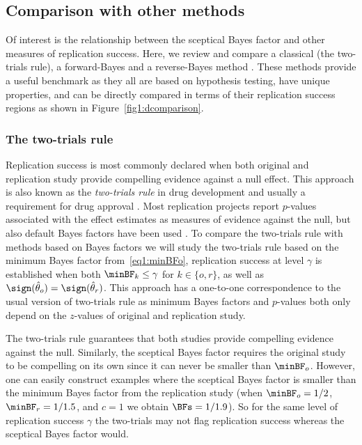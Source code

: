 \subsection{Comparison with other methods}
Of interest is the relationship between the sceptical Bayes factor and other
measures of replication success. Here, we review and compare a classical (the
two-trials rule), a forward-Bayes \citep[the replication Bayes factor
from][]{Verhagen2014} and a reverse-Bayes method \citep[the sceptical $p$-value
from][]{Held2020}. These methods provide a useful benchmark as they all are
based on hypothesis testing, have unique properties, and can be directly
compared in terms of their replication success regions as shown in
Figure~\ref{fig1:dcomparison}.


\subsubsection{The two-trials rule}
Replication success is most commonly declared when both original and replication
study provide compelling evidence against a null effect. This approach is also
known as the \emph{two-trials rule} in drug development and usually a
requirement for drug approval \citep[Section 9.4]{Kay2015}. Most replication
projects report $p$-values associated with the effect estimates as measures of
evidence against the null, but also default Bayes factors have been used
\citep[see \eg the Bayesian supplement of][]{Camerer2018}. To compare the
two-trials rule with methods based on Bayes factors we will study the two-trials
rule based on the minimum Bayes factor from~\eqref{eq1:minBFo}, \ie replication
success at level $\gamma$ is established when both
$\minBF_{k} %
\leq \gamma$ for $k \in \{o, r\}$, as well as
$\sign(\hat{\theta}_o) = \sign(\hat{\theta}_r)$. This approach has a one-to-one
correspondence to the usual version of two-trials rule as minimum Bayes factors
and $p$-values both only depend on the $z$-values of original and replication
study.



The two-trials rule guarantees that both studies provide compelling evidence
against the null. Similarly, the sceptical Bayes factor requires the original
study to be compelling on its own since it can never be smaller than
$\minBF_{o}$. However, one can easily construct examples where the sceptical
Bayes factor is smaller than the minimum Bayes factor from the replication study
(\eg when $\minBF_{o} = 1/2$,
$\minBF_{r} = 1/1.5$, and $c = 1$
we obtain $\BFs = 1/1.9$). So for the same level of
replication success $\gamma$ the two-trials may not flag replication success
whereas the sceptical Bayes factor would.

